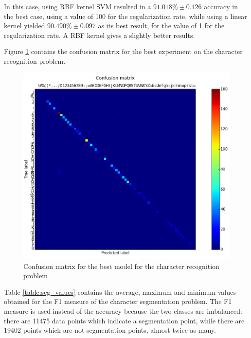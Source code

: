 In this case, using RBF kernel SVM resulted in a $ 91.018\% \pm 0.126 $ accuracy in the best case, using a value of 100 for the regularization rate, while using a linear kernel yielded $ 90.490\% \pm 0.097 $ as its best result, for the value of 1 for the regularization rate. A RBF kernel gives a slightly better results.

Figure \ref{fig:conf_matrix} contains the confusion matrix for the best experiment on the character recognition problem.



\begin{figure}[h!]
\begin{center}
\includegraphics[width=0.8\linewidth]{img/rec_cm.png}
\caption{\label{fig:conf_matrix}
Confusion matrix for the best model for the character recognition problem}
\end{center}
\end{figure}

Table \ref{table:seg_values} contains the average, maximum and minimum values obtained for the F1 measure\cite{fawcett2006introduction} of the character segmentation problem. The F1 measure is used instead of the accuracy because the two classes are imbalanced: there are 11475 data points which indicate a segmentation point, while there are 19402 points which are not segmentation points, almost twice as many. 

